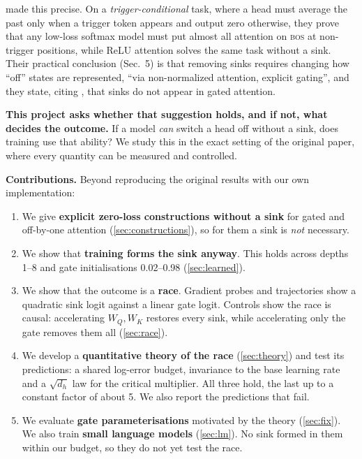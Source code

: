 \documentclass{article} %
\newcommand{\bos}{\textsc{bos}}
\begin{document}
\citet{ranmilo2026sinks} made this precise. On a \emph{trigger-conditional} task, where a head must average
the past only when a trigger token appears and output zero otherwise, they prove that any low-loss softmax
model must put almost all attention on \bos{} at non-trigger positions, while ReLU attention solves the same
task without a sink. Their practical conclusion (Sec.~5) is that removing sinks requires changing how ``off''
states are represented, ``via non-normalized attention, explicit gating'', and they state, citing
\citet{qiu2025gated}, that sinks do not appear in gated attention.

\textbf{This project asks whether that suggestion holds, and if not, what decides the outcome.} If a model
\emph{can} switch a head off without a sink, does training use that ability? We study this in the exact
setting of the original paper, where every quantity can be measured and controlled.

\textbf{Contributions.} Beyond reproducing the original results with our own implementation:
\begin{enumerate}
  \item We give \textbf{explicit zero-loss constructions without a sink} for gated and off-by-one attention
        (\cref{sec:constructions}), so for them a sink is \emph{not} necessary.
  \item We show that \textbf{training forms the sink anyway}. This holds across depths 1--8 and gate
        initialisations 0.02--0.98 (\cref{sec:learned}).
  \item We show that the outcome is a \textbf{race}. Gradient probes and trajectories show a quadratic sink
        logit against a linear gate logit. Controls show the race is causal: accelerating $W_Q,W_K$ restores every
        sink, while accelerating only the gate removes them all (\cref{sec:race}).
  \item We develop a \textbf{quantitative theory of the race} (\cref{sec:theory}) and test its predictions:
        a shared log-error budget, invariance to the base learning rate and a $\sqrt{d_h}$ law for the critical
        multiplier. All three hold, the last up to a constant factor of about 5. We also
        report the predictions that fail.
  \item We evaluate \textbf{gate parameterisations} motivated by the theory (\cref{sec:fix}). We also train
        \textbf{small language models} (\cref{sec:lm}). No sink formed in them within our budget, so they do
        not yet test the race.
\end{enumerate}
\end{document}
